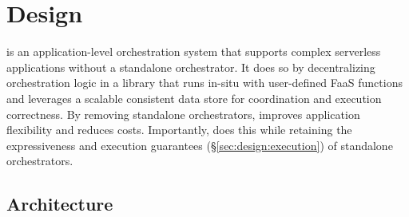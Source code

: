 \section{Design}\label{sec:design}

\name{} is an application-level orchestration system that supports complex
serverless applications without a standalone orchestrator. It does so by
decentralizing orchestration logic in a library that runs in-situ with
user-defined FaaS functions and leverages a scalable consistent data store for
coordination and execution correctness. By removing standalone orchestrators,
\name{} improves application flexibility and reduces costs. Importantly,
\name{} does this while retaining the expressiveness and execution guarantees
(\S\ref{sec:design:execution}) of standalone orchestrators.

\subsection{Architecture}\label{sec:design:architecture}

